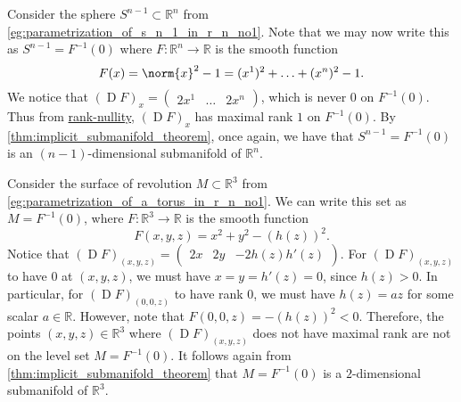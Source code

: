 \documentclass[notoc,notitlepage]{tufte-book}
\DeclareMathOperator{\D}{D}
\begin{document}
\begin{eg}\label{eg:parametrization_of_s_n_1_in_r_n_no2}
  Consider the sphere $S^{n - 1} \subset \mathbb{R}^n$ from
  \cref{eg:parametrization_of_s_n_1_in_r_n_no1}. Note that we may now write this
  as $S^{ n - 1 } = F^{-1}(0)$ where $F : \mathbb{R}^n \to \mathbb{R}$ is the
  smooth function
  \begin{equation*}
    F(x) = \norm{x}^2 - 1 = (x^1)^2 + \hdots + (x^n)^2 - 1.
  \end{equation*}
  We notice that $(\D F)_x = \begin{pmatrix} 2x^1 & \hdots & 2x^n
  \end{pmatrix}$, which is never $0$ on $F^{-1}(0)$. Thus from
  \hyperref[thm:rank_nullity_theorem]{rank-nullity}, $(\D F)_x$ has maximal rank
  $1$ on $F^{-1}(0)$. By
  \cref{thm:implicit_submanifold_theorem}, once again,
  we have that $S^{n - 1} = F^{-1}(0)$ is an $(n - 1)$-dimensional submanifold
  of $\mathbb{R}^n$.
\end{eg}

\begin{eg}
  Consider the surface of revolution $M \subset \mathbb{R}^3$ from
  \cref{eg:parametrization_of_a_torus_in_r_n_no1}. We can write this set as $M =
  F^{-1}(0)$, where $F : \mathbb{R}^3 \to \mathbb{R}$ is the smooth function
  \begin{equation*}
    F(x, y, z) = x^2 + y^2 - (h(z))^2.
  \end{equation*}
  Notice that $(\D F)_{(x, y, z)} = \begin{pmatrix} 2x & 2y & -2h(z)h'(z)
  \end{pmatrix}$. For $(\D F)_{(x, y, z)}$ to have $0$ at $(x, y, z)$, we
  must have $x = y = h'(z) = 0$, since $h(z) > 0$. In particular, for $(\D
  F)_{(0, 0, z)}$ to have rank $0$, we must have $h(z) = az$ for some scalar $a \in
  \mathbb{R}$. However, note that $F(0, 0, z) = -(h(z))^2 < 0$. Therefore, the
  points $(x, y, z) \in \mathbb{R}^3$ where $(\D F)_{(x, y, z)}$ does not have
  maximal rank are not on the level set $M = F^{-1}(0)$. It follows again from
  \cref{thm:implicit_submanifold_theorem} that $M =
  F^{-1}(0)$ is a $2$-dimensional submanifold of $\mathbb{R}^3$.
\end{eg}
\end{document}
